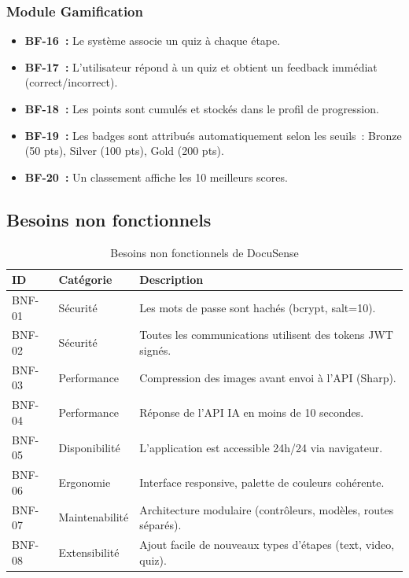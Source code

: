 \documentclass[12pt, a4paper, twoside, openany]{report}
\begin{document}
\subsubsection{Module Gamification}
\begin{itemize}
  \item \textbf{BF-16~:} Le syst\`eme associe un quiz \`a chaque \'etape.
  \item \textbf{BF-17~:} L'utilisateur r\'epond \`a un quiz et obtient un feedback
        imm\'ediat (correct/incorrect).
  \item \textbf{BF-18~:} Les points sont cumul\'es et stock\'es dans le profil de
        progression.
  \item \textbf{BF-19~:} Les badges sont attribu\'es automatiquement selon les
        seuils~: Bronze (50 pts), Silver (100 pts), Gold (200 pts).
  \item \textbf{BF-20~:} Un classement affiche les 10 meilleurs scores.
\end{itemize}

\subsection{Besoins non fonctionnels}

\begin{table}[H]
  \centering
  \caption{Besoins non fonctionnels de DocuSense}
  \label{tab:bnf}
  \begin{tabularx}{\textwidth}{l l X}
    \toprule
    \textbf{ID} & \textbf{Cat\'egorie} & \textbf{Description} \\
    \midrule
    BNF-01 & S\'ecurit\'e & Les mots de passe sont hach\'es (bcrypt, salt=10). \\
    BNF-02 & S\'ecurit\'e & Toutes les communications utilisent des tokens JWT
                              sign\'es. \\
    BNF-03 & Performance  & Compression des images avant envoi \`a l'API (Sharp). \\
    BNF-04 & Performance  & R\'eponse de l'API IA en moins de 10 secondes. \\
    BNF-05 & Disponibilit\'e & L'application est accessible 24h/24 via navigateur. \\
    BNF-06 & Ergonomie    & Interface responsive, palette de couleurs coh\'erente. \\
    BNF-07 & Maintenabilit\'e & Architecture modulaire (contr\^oleurs, mod\`eles,
                                routes s\'epar\'es). \\
    BNF-08 & Extensibilit\'e & Ajout facile de nouveaux types d'\'etapes (text,
                                video, quiz). \\
    \bottomrule
  \end{tabularx}
\end{table}
\end{document}
